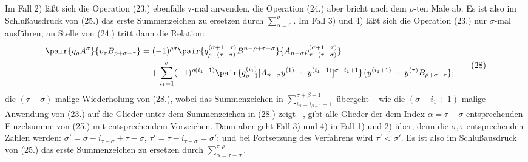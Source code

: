 Im Fall 2) l\"a\ss t sich die Operation (23.) ebenfalls $\tau$-mal anwenden, die Operation (24.) aber bricht nach dem $\rho$-ten Male ab. Es ist also im Schlu\ss ausdruck von (25.) das erste Summenzeichen zu ersetzen durch $\sum_{\alpha=0}^{\rho}$. Im Fall 3) und 4) l\"a\ss t sich die Operation (23.) nur $\sigma$-mal ausf\"uhren; an Stelle von (24.) tritt dann die Relation:
\begin{equation}
\begin{aligned}
\pair{q_\rho A^\sigma}{p_\tau B_{\rho+\sigma-\tau}}
&=(-1)^{\rho\sigma}
 \pair{q_{\rho-(\tau-\sigma)}^{(\sigma+1\ldots\tau)}B^{n-\rho+\tau-\sigma}}{A_{n-\sigma}p_{\tau-(\tau-\sigma)}^{(\sigma+1\ldots\tau)}}\\
&\quad+\sum_{i_1=1}^{\sigma}(-1)^{\rho(i_1-1)}
 \pair{q_{\rho-1}^{(i_1)}[A_{n-\sigma}y^{(1)}\cdots y^{(i_1-1)}]^{\sigma-i_1+1}}
 {y^{(i_1+1)}\cdots y^{(\tau)}B_{\rho+\sigma-\tau}};
\end{aligned}
\tag{28}
\end{equation}
die $(\tau-\sigma)$-malige Wiederholung von (28.), wobei das Summenzeichen in $\sum_{i_\beta=i_{\beta-1}+1}^{\sigma+\beta-1}$ \"ubergeht -- wie die $(\sigma-i_1+1)$-malige Anwendung von (23.) auf die Glieder unter dem Summenzeichen in (28.) zeigt --, gibt alle Glieder der dem Index $\alpha=\tau-\sigma$ entsprechenden Einzelsumme von (25.) mit entsprechendem Vorzeichen. Dann aber geht Fall 3) und 4) in Fall 1) und 2) \"uber, denn die $\sigma,\tau$ entsprechenden Zahlen werden: $\sigma'=\sigma-i_{\tau-\sigma}+\tau-\sigma$, $\tau'=\tau-i_{\tau-\sigma}=\sigma'$; und bei Fortsetzung des Verfahrens wird $\tau'<\sigma'$. Es ist also im Schlu\ss ausdruck von (25.) das erste Summenzeichen zu ersetzen durch $\sum_{\alpha=\tau-\sigma}^{\tau,\rho}$.
